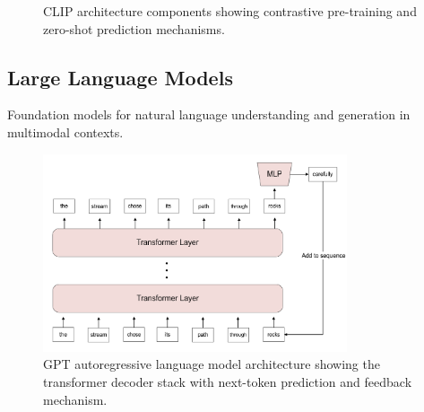 \begin{figure}[htbp]
\centering
{}
\hfill
{}
\caption{CLIP architecture components showing contrastive pre-training and zero-shot prediction mechanisms.}
\label{fig:clip_architecture}
\end{figure}

\subsection{Large Language Models}

Foundation models for natural language understanding and generation in multimodal contexts.

\begin{figure}[htbp]
\centering
\includegraphics[width=0.8\textwidth]{Images/gpt.png}
\caption{GPT autoregressive language model architecture showing the transformer decoder stack with next-token prediction and feedback mechanism.}
\label{fig:gpt}
\end{figure}